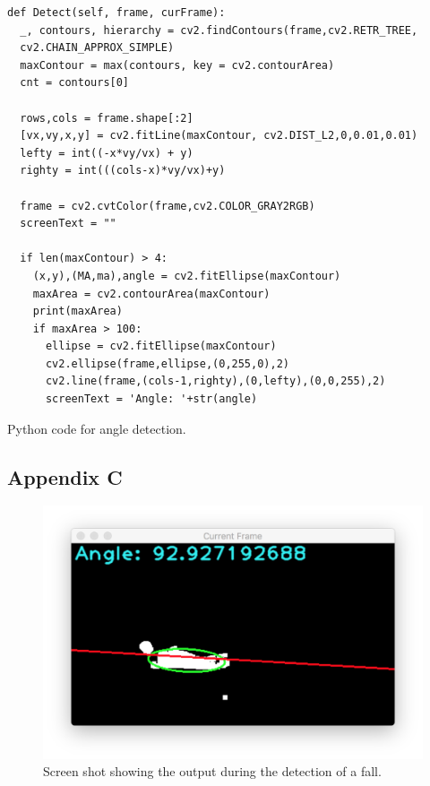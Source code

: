 \documentclass[11pt,a4paper]{report}
\begin{document}
\begin{listing}
\begin{verbatim}
def Detect(self, frame, curFrame):
  _, contours, hierarchy = cv2.findContours(frame,cv2.RETR_TREE,
  cv2.CHAIN_APPROX_SIMPLE)
  maxContour = max(contours, key = cv2.contourArea)
  cnt = contours[0]

  rows,cols = frame.shape[:2]
  [vx,vy,x,y] = cv2.fitLine(maxContour, cv2.DIST_L2,0,0.01,0.01)
  lefty = int((-x*vy/vx) + y)
  righty = int(((cols-x)*vy/vx)+y)

  frame = cv2.cvtColor(frame,cv2.COLOR_GRAY2RGB)
  screenText = ""

  if len(maxContour) > 4:
    (x,y),(MA,ma),angle = cv2.fitEllipse(maxContour)
    maxArea = cv2.contourArea(maxContour)
    print(maxArea)
    if maxArea > 100:
      ellipse = cv2.fitEllipse(maxContour)
      cv2.ellipse(frame,ellipse,(0,255,0),2)
      cv2.line(frame,(cols-1,righty),(0,lefty),(0,0,255),2)
      screenText = 'Angle: '+str(angle)
\end{verbatim}
\caption{Python code for angle detection.}
\label{angleDetectionPython}
\end{listing}

\subsection{Appendix C}

\begin{figure}[H]
 \centering
 \includegraphics[scale = 0.6]{fallDetected.png}
 \caption{Screen shot showing the output during the detection of a fall.}
 \label{fig:fallDetected}
\end{figure}
\end{document}
